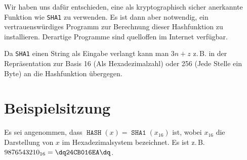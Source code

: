 \documentclass{scrartcl}
\newcommand{\SHAone}{\texttt{SHA1}}
\DeclareMathOperator{\hash}{\texttt{HASH}}
\begin{document}
Wir haben uns dafür entschieden, eine als kryptographisch sicher anerkannte
Funktion wie \SHAone{} zu verwenden. Es ist dann aber notwendig, ein
vertrauenswürdiges Programm zur Berechnung dieser Hashfunktion zu installieren.
Derartige Programme sind quelloffen im Internet verfügbar.

Da \SHAone{} einen String als Eingabe verlangt kann man $3n+z$ z.\,B. in der
Repräsentation zur Basis 16 (Als Hexadezimalzahl) oder 256 (Jede Stelle ein
Byte) an die Hashfunktion übergegen.

\section{Beispielsitzung}

Es sei angenommen, dass $\hash(x) = \mathop{\SHAone}(x_{16})$ ist, wobei
$x_{16}$ die Darstellung von $x$ im Hexadezimalsystem bezeichnet. Es ist z.\,B.
$9876543210_{16} = \texttt{\dq24CB016EA\dq}$.
\end{document}
